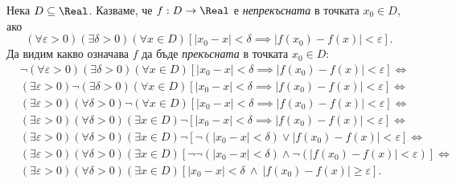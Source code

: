 \begin{example}
  Нека $D \subseteq \Real$.
  Казваме, че $f:D \to \Real$ е {\em непрекъсната} в точката $x_0 \in D$, ако 
  \[(\forall \varepsilon > 0)(\exists \delta >0)(\forall x\in D)[|x_0 - x| < \delta \implies |f(x_0) - f(x)| < \varepsilon].\]
  Да видим какво означава $f$ да бъде {\em прекъсната} в точката $x_0 \in D$:
  \begin{align*}
    & \neg (\forall \varepsilon > 0)(\exists \delta >0)(\forall x\in D)[|x_0 - x| < \delta \implies |f(x_0) - f(x)| < \varepsilon] \iff\\
    & (\exists \varepsilon > 0) \neg (\exists \delta >0)(\forall x\in D)[|x_0 - x| < \delta \implies |f(x_0) - f(x)| < \varepsilon] \iff \\
    & (\exists \varepsilon > 0)(\forall \delta >0)\neg(\forall x\in D)[|x_0 - x| < \delta \implies |f(x_0) - f(x)| < \varepsilon] \iff \\
    & (\exists \varepsilon > 0)(\forall \delta >0)(\exists x\in D)\neg[|x_0 - x| < \delta \implies |f(x_0) - f(x)| < \varepsilon] \iff \\
    & (\exists \varepsilon > 0)(\forall \delta >0)(\exists x\in D)\neg[\neg (|x_0 - x| <\delta) \vee |f(x_0) - f(x)| < \varepsilon] \iff \\
    & (\exists \varepsilon > 0)(\forall \delta >0)(\exists x\in D)[\neg\neg (|x_0 - x| <\delta) \land \neg (|f(x_0) - f(x)| < \varepsilon)] \iff \\
    & (\exists \varepsilon > 0)(\forall \delta >0)(\exists x\in D)[|x_0 - x| < \delta\ \land\ |f(x_0) - f(x)| \geq \varepsilon].
  \end{align*}
\end{example}


